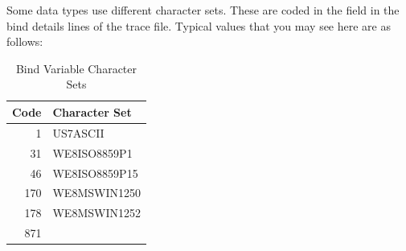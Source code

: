 \begin{appendix}
Some data types use different character sets. These are coded in the
 field in the bind details lines of the trace file.
Typical values that you may see here are as follows:

\begin{longtable}[]{@{}r|l@{}}
\toprule
\begin{minipage}[b]{0.09\columnwidth}\raggedright\strut
Code\strut
\end{minipage} & \begin{minipage}[b]{0.21\columnwidth}\raggedright\strut
Character Set\strut
\end{minipage}\tabularnewline
\midrule
\endhead
\hline
\caption{Bind Variable Character Sets}
\endfoot
\begin{minipage}[t]{0.09\columnwidth}\raggedright\strut
1\strut
\end{minipage} & \begin{minipage}[t]{0.21\columnwidth}\raggedright\strut
US7ASCII\strut
\end{minipage}\tabularnewline
\begin{minipage}[t]{0.09\columnwidth}\raggedright\strut
31\strut
\end{minipage} & \begin{minipage}[t]{0.21\columnwidth}\raggedright\strut
WE8ISO8859P1\strut
\end{minipage}\tabularnewline
\begin{minipage}[t]{0.09\columnwidth}\raggedright\strut
46\strut
\end{minipage} & \begin{minipage}[t]{0.21\columnwidth}\raggedright\strut
WE8ISO8859P15\strut
\end{minipage}\tabularnewline
\begin{minipage}[t]{0.09\columnwidth}\raggedright\strut
170\strut
\end{minipage} & \begin{minipage}[t]{0.21\columnwidth}\raggedright\strut
WE8MSWIN1250\strut
\end{minipage}\tabularnewline
\begin{minipage}[t]{0.09\columnwidth}\raggedright\strut
178\strut
\end{minipage} & \begin{minipage}[t]{0.21\columnwidth}\raggedright\strut
WE8MSWIN1252\strut
\end{minipage}\tabularnewline
\begin{minipage}[t]{0.09\columnwidth}\raggedright\strut
871\strut
\end{minipage} & \begin{minipage}[t]{0.21\columnwidth}\raggedright\strut

\end{minipage}
\end{longtable}
\end{appendix}
